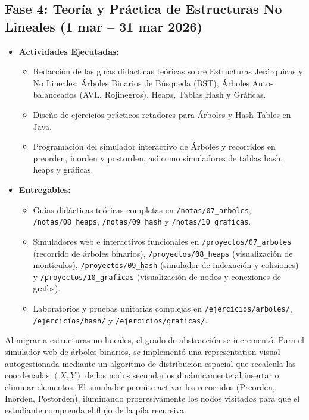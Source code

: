 \documentclass[12 pt]{article}
\begin{document}
\subsection*{Fase 4: Teoría y Práctica de Estructuras No Lineales (1 mar – 31 mar 2026)}
\begin{itemize}
    \item \textbf{Actividades Ejecutadas:}
    \begin{itemize}
        \item Redacción de las guías didácticas teóricas sobre Estructuras Jerárquicas y No Lineales: Árboles Binarios de Búsqueda (BST), Árboles Auto-balanceados (AVL, Rojinegros), Heaps, Tablas Hash y Gráficas.
        \item Diseño de ejercicios prácticos retadores para Árboles y Hash Tables en Java.
        \item Programación del simulador interactivo de Árboles y recorridos en preorden, inorden y postorden, así como simuladores de tablas hash, heaps y gráficas.
    \end{itemize}
    \item \textbf{Entregables:}
    \begin{itemize}
        \item Guías didácticas teóricas completas en \texttt{/notas/07\_arboles}, \texttt{/notas/08\_heaps}, \texttt{/notas/09\_hash} y \texttt{/notas/10\_graficas}.
        \item Simuladores web e interactivos funcionales en \texttt{/proyectos/07\_arboles} (recorrido de árboles binarios), \texttt{/proyectos/08\_heaps} (visualización de montículos), \texttt{/proyectos/09\_hash} (simulador de indexación y colisiones) y \texttt{/proyectos/10\_graficas} (visualización de nodos y conexiones de grafos).
        \item Laboratorios y pruebas unitarias complejas en \texttt{/ejercicios/arboles/}, \texttt{/ejercicios/hash/} y \texttt{/ejercicios/graficas/}.
    \end{itemize}
\end{itemize}

Al migrar a estructuras no lineales, el grado de abstracción se incrementó. Para el simulador web de árboles binarios, se implementó una representation visual autogestionada mediante un algoritmo de distribución espacial que recalcula las coordenadas $(X, Y)$ de los nodos secundarios dinámicamente al insertar o eliminar elementos. El simulador permite activar los recorridos (Preorden, Inorden, Postorden), iluminando progresivamente los nodos visitados para que el estudiante comprenda el flujo de la pila recursiva.
\end{document}
